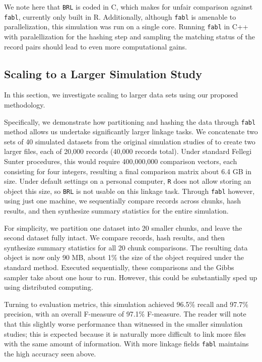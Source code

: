 \documentclass[12pt,letterpaper]{article}
\newcommand{\1}[1]{\mathbb{I}\!\left[#1\right]} %
\begin{document}
We note here that \texttt{BRL} is coded in C, which makes for unfair
comparison against \texttt{fabl}, currently only built in R.
Additionally, although \texttt{fabl} is amenable to parallelization,
this simulation was run on a single core. Running \texttt{fabl} in C++
with paralellization for the hashing step and sampling the matching
status of the record pairs should lead to even more computational gains.

\hypertarget{scale}{%
	\subsection{Scaling to a Larger Simulation Study}\label{scale}}

In this section, we investigate scaling to larger data sets using our proposed methodology. 
 
Specifically, we demonstrate how partitioning and hashing the data through \texttt{fabl} method allows us undertake significantly larger linkage tasks. We concatenate two sets of 40 simulated datasets from the original simulation studies of \cite{} to create two larger files, each of 20,000 records (40,000 records total). Under standard Fellegi Sunter procedures, this would require 400,000,000 comparison vectors, each consisting for four integers, resulting a final comparison matrix about 6.4 GB in size. Under default settings on a personal computer, \texttt{R} does not allow storing an object this size, so \texttt{BRL} is not usable on this linkage task. Through \texttt{fabl} however, using just one machine, we sequentially compare records across chunks, hash results, and then synthesize summary statistics for the entire simulation.  
 
For simplicity, we partition one dataset into 20 smaller chunks, and leave the second dataset fully intact. We compare records, hash results, and then synthesize summary statistics for all 20 chunk comparisons. The resulting data object is now only 90 MB, about 1\% the size of the object required under the standard method. Executed sequentially, these comparisons and the Gibbs sampler take about one hour to run. However, this could be substantially sped up using distributed computing.

Turning to evaluation metrics, this simulation achieved 96.5\% recall and 97.7\% precision, with an overall F-measure of 97.1\% F-measure. The reader will note that this slightly worse performance than witnessed in the smaller simulation studies; this is expected because it is naturally more difficult to link more files with the same amount of information. With more linkage fields \texttt{fabl} maintains the high accuracy seen above. 
\end{document}
